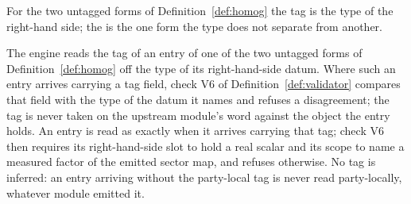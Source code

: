 
For the two untagged forms of Definition~\ref{def:homog} the tag is the type
of the right-hand side; the  is the one form the type does
not separate from another.

\begin{requirement}\label{req:tag-reading}
The engine reads the tag of an entry of one of the two untagged forms of
Definition~\ref{def:homog} off the type of its right-hand-side datum. Where
such an entry arrives carrying a tag field, check V6 of
Definition~\ref{def:validator} compares that field with the type of the
datum it names and refuses a disagreement; the tag is never taken on the
upstream module's word against the object the entry holds. An entry is read
as  exactly when it arrives carrying that tag; check V6
then requires its right-hand-side slot to hold a real scalar and its scope to
name a measured factor of the emitted sector map, and refuses otherwise. No
tag is inferred: an entry arriving without the party-local tag is never read
party-locally, whatever module emitted it.
\end{requirement}
